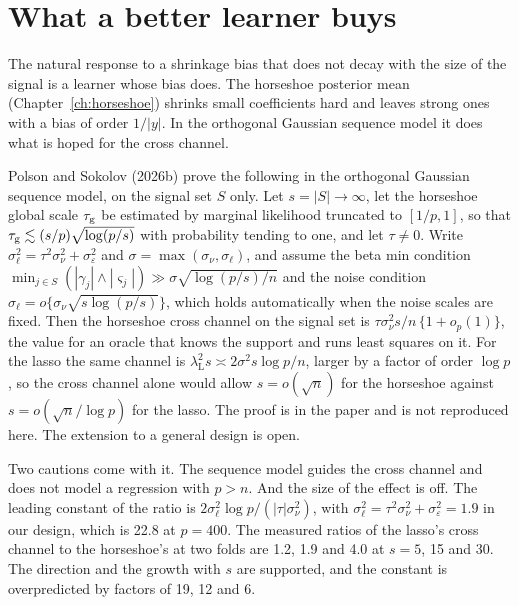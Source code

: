 \section{What a better learner buys}\label{sec:crit:learner}

The natural response to a shrinkage bias that does not decay with the size of the signal is a learner whose bias does. The horseshoe posterior mean (Chapter~\ref{ch:horseshoe}) shrinks small coefficients hard and leaves strong ones with a bias of order $1/|y|$. In the orthogonal Gaussian sequence model it does what is hoped for the cross channel.

\begin{remark}\label{crit:thm:hsoracle}
Polson and Sokolov (2026b) prove the following in the orthogonal Gaussian sequence model, on the signal set $S$ only. Let $s = |S| \to \infty$, let the horseshoe global scale $\tau_{\mathrm{g}}$ be estimated by marginal likelihood truncated to $[1/p, 1]$, so that $\tau_{\mathrm{g}} \lesssim (s/p)\sqrt{\log(p/s)}$ with probability tending to one, and let $\tau \ne 0$. Write $\sigma_\ell^2 = \tau^2\sigma_\nu^2 + \sigma_\varepsilon^2$ and $\sigma = \max(\sigma_\nu, \sigma_\ell)$, and assume the beta min condition $\min_{j \in S}(|\gamma_j| \wedge |\varsigma_j|) \gg \sigma\sqrt{\log(p/s)/n}$ and the noise condition $\sigma_\ell = o\{\sigma_\nu\sqrt{s\log(p/s)}\}$, which holds automatically when the noise scales are fixed. Then the horseshoe cross channel on the signal set is $\tau\sigma_\nu^2 s/n\,\{1 + o_p(1)\}$, the value for an oracle that knows the support and runs least squares on it. For the lasso the same channel is $\lambda_{\mathrm L}^2 s \asymp 2\sigma^2 s\log p/n$, larger by a factor of order $\log p$, so the cross channel alone would allow $s = o(\sqrt n)$ for the horseshoe against $s = o(\sqrt n/\log p)$ for the lasso. The proof is in the paper and is not reproduced here. The extension to a general design is open.
\end{remark}

Two cautions come with it. The sequence model guides the cross channel and does not model a regression with $p > n$. And the size of the effect is off. The leading constant of the ratio is $2\sigma_\ell^2\log p/(|\tau|\sigma_\nu^2)$, with $\sigma_\ell^2 = \tau^2\sigma_\nu^2 + \sigma_\varepsilon^2 = 1.9$ in our design, which is 22.8 at $p = 400$. The measured ratios of the lasso's cross channel to the horseshoe's at two folds are 1.2, 1.9 and 4.0 at $s = 5$, 15 and 30. The direction and the growth with $s$ are supported, and the constant is overpredicted by factors of 19, 12 and 6.

